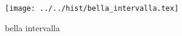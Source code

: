 \begin{figure}[h] \centering\texttt{[image: ../../hist/bella\_intervalla.tex]}\caption{bella intervalla}\label{hist:bella_intervalla} \end{figure}
